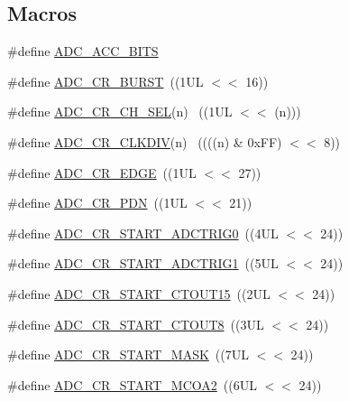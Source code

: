 \subsection*{Macros}
\begin{DoxyCompactItemize}
\item 
\#define \hyperlink{group__ADC__17XX__40XX_gaefa27b66d67f803cccaf6c1d63e93fb8}{A\+D\+C\+\_\+\+A\+C\+C\+\_\+B\+I\+TS}
\item 
\#define \hyperlink{group__ADC__17XX__40XX_gac4274c705620f3ddd5ba7f73249e6248}{A\+D\+C\+\_\+\+C\+R\+\_\+\+B\+U\+R\+ST}~((1\+U\+L $<$$<$ 16))
\item 
\#define \hyperlink{group__ADC__17XX__40XX_ga461cf06d462d1064b6f8d0fca2062912}{A\+D\+C\+\_\+\+C\+R\+\_\+\+C\+H\+\_\+\+S\+EL}(n)            ~((1\+U\+L $<$$<$ (n)))
\item 
\#define \hyperlink{group__ADC__17XX__40XX_ga9be6e40f324358994173de6598eeeabf}{A\+D\+C\+\_\+\+C\+R\+\_\+\+C\+L\+K\+D\+IV}(n)            ~((((n) \& 0x\+F\+F) $<$$<$ 8))
\item 
\#define \hyperlink{group__ADC__17XX__40XX_ga1d05d43234dd2d1489841dff0012225e}{A\+D\+C\+\_\+\+C\+R\+\_\+\+E\+D\+GE}~((1\+U\+L $<$$<$ 27))
\item 
\#define \hyperlink{group__ADC__17XX__40XX_ga7474e4ab5695434acbfe8a5fcad35ef0}{A\+D\+C\+\_\+\+C\+R\+\_\+\+P\+DN}~((1\+U\+L $<$$<$ 21))
\item 
\#define \hyperlink{group__ADC__17XX__40XX_gad37a3aadfc28d617b673194170831de6}{A\+D\+C\+\_\+\+C\+R\+\_\+\+S\+T\+A\+R\+T\+\_\+\+A\+D\+C\+T\+R\+I\+G0}~((4\+U\+L $<$$<$ 24))
\item 
\#define \hyperlink{group__ADC__17XX__40XX_ga900f9645ad799143f6db3568947bdf44}{A\+D\+C\+\_\+\+C\+R\+\_\+\+S\+T\+A\+R\+T\+\_\+\+A\+D\+C\+T\+R\+I\+G1}~((5\+U\+L $<$$<$ 24))
\item 
\#define \hyperlink{group__ADC__17XX__40XX_gab4000daab3c792e48cf8d3de3e5b0a36}{A\+D\+C\+\_\+\+C\+R\+\_\+\+S\+T\+A\+R\+T\+\_\+\+C\+T\+O\+U\+T15}~((2\+U\+L $<$$<$ 24))
\item 
\#define \hyperlink{group__ADC__17XX__40XX_ga6be3ddfec0f4d7d9b8f56363b100ecef}{A\+D\+C\+\_\+\+C\+R\+\_\+\+S\+T\+A\+R\+T\+\_\+\+C\+T\+O\+U\+T8}~((3\+U\+L $<$$<$ 24))
\item 
\#define \hyperlink{group__ADC__17XX__40XX_gadb696eab756362a8e2dbc5502f8bdeaf}{A\+D\+C\+\_\+\+C\+R\+\_\+\+S\+T\+A\+R\+T\+\_\+\+M\+A\+SK}~((7\+U\+L $<$$<$ 24))
\item 
\#define \hyperlink{group__ADC__17XX__40XX_gae86c1cc94b370b0313ea4dbc09514d2f}{A\+D\+C\+\_\+\+C\+R\+\_\+\+S\+T\+A\+R\+T\+\_\+\+M\+C\+O\+A2}~((6\+U\+L $<$$<$ 24))
$$
\end{DoxyCompactItemize}

